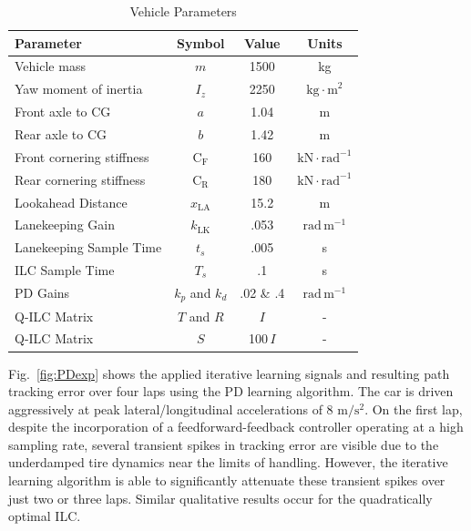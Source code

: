 \documentclass[letterpaper, 10 pt, conference]{ieeeconf}  %
\begin{document}
\begin{table}[h]
\small
\begin{center}
\caption{Vehicle Parameters}\label{tb:params}
\begin{tabular}{lccc}
Parameter & Symbol & Value & Units \\\hline
Vehicle mass & $m$ & 1500 & kg \\
Yaw moment of inertia & $I_z$ & 2250 & $\mathrm{kg \cdot m}^2$\\
Front axle to CG & $a$ & 1.04 & m\\
Rear axle to CG & $b$ & 1.42 & m\\
Front cornering stiffness & $\mathrm{C}_\mathrm{F}$ & 160 & $\mathrm{kN \cdot rad}^{-1}$ \\
Rear cornering stiffness & $\mathrm{C}_\mathrm{R}$ & 180 & $\mathrm{kN \cdot rad}^{-1}$ \\
Lookahead Distance       & $x_\mathrm{LA}$          &  15.2 & $\mathrm{m} $ \\
Lanekeeping Gain         & $k_{\mathrm{LK}}$         & .053 & $\mathrm{rad\,m^{-1}}$\\
Lanekeeping Sample Time  & $t_s$                        & .005 & s\\
ILC Sample Time          & $T_s$                        & .1   & s\\
PD Gains                 & $k_p$ and $k_d$           & .02 \& .4 & $\mathrm{rad\,m^{-1}}$\\
Q-ILC Matrix             & $T$ and $R$              &  $I$      & - \\
Q-ILC Matrix             & $S$                       & 100\,$I$  & - \\\hline
\end{tabular}
\end{center}
\end{table}

Fig.~\ref{fig:PDexp} shows the applied iterative learning signals and resulting path tracking error over four laps using the PD learning algorithm. The car is driven
aggressively at peak lateral/longitudinal accelerations of 8 $\mathrm{m/s^2}$. On the first lap, despite the 
incorporation of a feedforward-feedback controller operating at a high sampling rate, several transient spikes in tracking error are visible due to the underdamped tire dynamics near the limits of handling.
However, the iterative learning algorithm is able to significantly attenuate these transient spikes over just two or three laps. Similar qualitative
results occur for the quadratically optimal ILC. 
\end{document}
